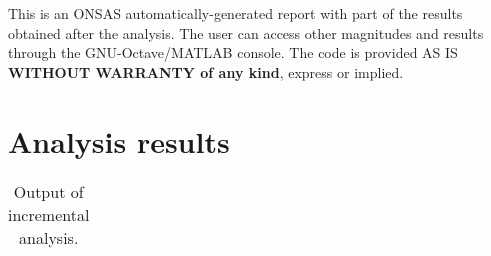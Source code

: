 \documentclass[a4paper,10pt]{article}
\begin{document}
 
This is an ONSAS automatically-generated report with part of the results obtained after the analysis. The user can access other magnitudes and results through the GNU-Octave/MATLAB console. The code is provided AS IS \textbf{WITHOUT WARRANTY of any kind}, express or implied.

\section{Analysis results}

\begin{longtable}{cccccccc} 
 
\caption{Output of incremental analysis.}
\end{longtable}
\end{document}
